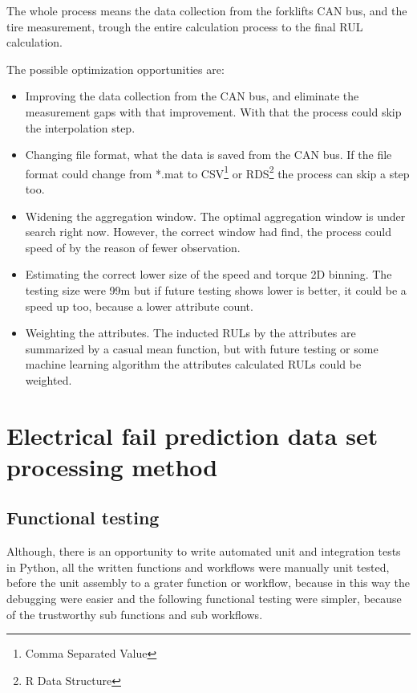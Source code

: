 The whole process means the data collection from the forklifts CAN bus, and the tire measurement, trough the entire calculation process to the final RUL calculation.

The possible optimization opportunities are:
\begin{itemize}
	\item{Improving the data collection from the CAN bus, and eliminate the measurement gaps with that improvement.} With that the process could skip the interpolation step. 
	\item{Changing file format, what the data is saved from the CAN bus.} If the file format could change from *.mat to CSV\footnote{Comma Separated Value} or RDS\footnote{R Data Structure} the process can skip a step too.
	\item{Widening the aggregation window.} The optimal aggregation window is under search right now. However, the correct window had find, the process could speed of by the reason of fewer observation.
	\item{Estimating the correct lower size of the speed and torque 2D binning.} The testing size were 9\*9m but if future testing shows lower is better, it could be a speed up too, because a lower attribute count.
	\item{Weighting the attributes.} The inducted RULs by the attributes are summarized by a casual mean function, but with future testing or some machine learning algorithm the attributes calculated RULs could be weighted.
\end{itemize} 
\section{Electrical fail prediction data set processing method}
\subsection{Functional testing}
Although, there is an opportunity to write automated unit and integration tests in Python, all the written functions and workflows were manually unit tested, before the unit assembly to a grater function or workflow, because in this way the debugging were easier and the following functional testing were simpler, because of the trustworthy sub functions and sub workflows.


